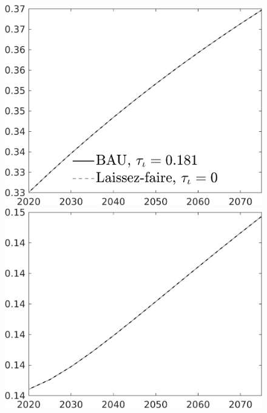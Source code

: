 \documentclass[12pt]{article}
\begin{document}
\begin{figure}[h!!]
\begin{minipage}[]{0.32\textwidth}
	\end{minipage}
	\begin{minipage}[]{0.32\textwidth}
		\includegraphics[width=1\textwidth]{../../codding_model/own_basedOnFried/optimalPol_010922_revision/figures/all_13Sept22/CompTaul_LFBAU_Reg0_pf_spillover0_nsk1_xgr0_knspil0_sep1_countec0_GovRev0_etaa0.79_lgd1.png}
	\end{minipage}	
	\begin{minipage}[]{0.32\textwidth}
		\includegraphics[width=1\textwidth]{../../codding_model/own_basedOnFried/optimalPol_010922_revision/figures/all_13Sept22/CompTaul_LFBAU_Reg0_pee_spillover0_nsk1_xgr0_knspil0_sep1_countec0_GovRev0_etaa0.79_lgd0.png}

\end{minipage}
\end{figure}
\end{document}
